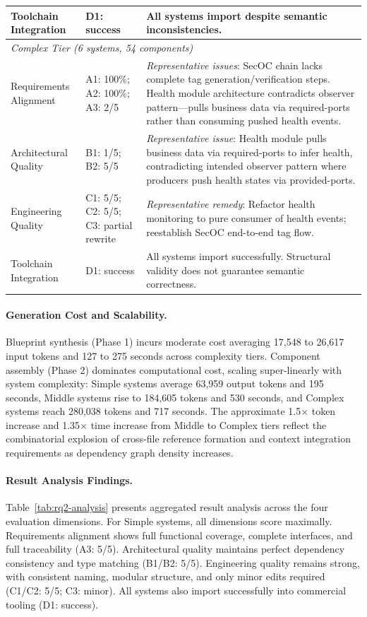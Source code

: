 \documentclass[acmlarge,nonacm]{acmart}
\theoremstyle{acmplain}
\theoremstyle{acmdefinition}
\begin{document}
\begin{table}[!htbp]
\begin{tabular}{@{}lp{}p{}@{}}
Toolchain Integration & D1: success & All systems import despite semantic inconsistencies. \\
\midrule
\multicolumn{3}{l}{\textit{Complex Tier (6 systems, 54 components)}} \\
\midrule
Requirements Alignment & A1: 100\%; A2: 100\%; A3: 2/5 & \textit{Representative issues}: SecOC chain lacks complete tag generation/verification steps. Health module architecture contradicts observer pattern—pulls business data via required-ports rather than consuming pushed health events. \\
Architectural Quality & B1: 1/5; B2: 5/5 & \textit{Representative issue}: Health module pulls business data via required-ports to infer health, contradicting intended observer pattern where producers push health states via provided-ports. \\
Engineering Quality & C1: 5/5; C2: 5/5; C3: partial rewrite & \textit{Representative remedy}: Refactor health monitoring to pure consumer of health events; reestablish SecOC end-to-end tag flow. \\
Toolchain Integration & D1: success & All systems import successfully. Structural validity does not guarantee semantic correctness. \\
\bottomrule
\end{tabular}
\end{table}

\paragraph{Generation Cost and Scalability.} Blueprint synthesis (Phase 1) incurs moderate cost averaging 17,548 to 26,617 input tokens and 127 to 275 seconds across complexity tiers. Component assembly (Phase 2) dominates computational cost, scaling super-linearly with system complexity: Simple systems average 63,959 output tokens and 195 seconds, Middle systems rise to 184,605 tokens and 530 seconds, and Complex systems reach 280,038 tokens and 717 seconds. The approximate 1.5× token increase and 1.35× time increase from Middle to Complex tiers reflect the combinatorial explosion of cross-file reference formation and context integration requirements as dependency graph density increases.

\paragraph{Result Analysis Findings.} Table~\ref{tab:rq2-analysis} presents aggregated result analysis across the four evaluation dimensions. For Simple systems, all dimensions score maximally. Requirements alignment shows full functional coverage, complete interfaces, and full traceability (A3: 5/5). Architectural quality maintains perfect dependency consistency and type matching (B1/B2: 5/5). Engineering quality remains strong, with consistent naming, modular structure, and only minor edits required (C1/C2: 5/5; C3: minor). All systems also import successfully into commercial tooling (D1: success).
\end{document}

